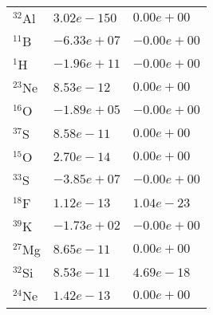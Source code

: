 \begin{tabular}{lll}
 $^{32}$Al & $3.02e-150 $                                                       & $0.00e+00 $                                                                     \\
 $^{11}$B  & $-6.33e+07 $                                                       & $-0.00e+00 $                                                                    \\
 $^{1}$H   & $-1.96e+11 $                                                       & $-0.00e+00 $                                                                    \\
 $^{23}$Ne & $8.53e-12 $                                                        & $0.00e+00 $                                                                     \\
 $^{16}$O  & $-1.89e+05 $                                                       & $-0.00e+00 $                                                                    \\
 $^{37}$S  & $8.58e-11 $                                                        & $0.00e+00 $                                                                     \\
 $^{15}$O  & $2.70e-14 $                                                        & $0.00e+00 $                                                                     \\
 $^{33}$S  & $-3.85e+07 $                                                       & $-0.00e+00 $                                                                    \\
 $^{18}$F  & $1.12e-13 $                                                        & $1.04e-23 $                                                                     \\
 $^{39}$K  & $-1.73e+02 $                                                       & $-0.00e+00 $                                                                    \\
 $^{27}$Mg & $8.65e-11 $                                                        & $0.00e+00 $                                                                     \\
 $^{32}$Si & $8.53e-11 $                                                        & $4.69e-18 $                                                                     \\
 $^{24}$Ne & $1.42e-13 $                                                        & $0.00e+00 $                                                                     \\

\end{tabular}
